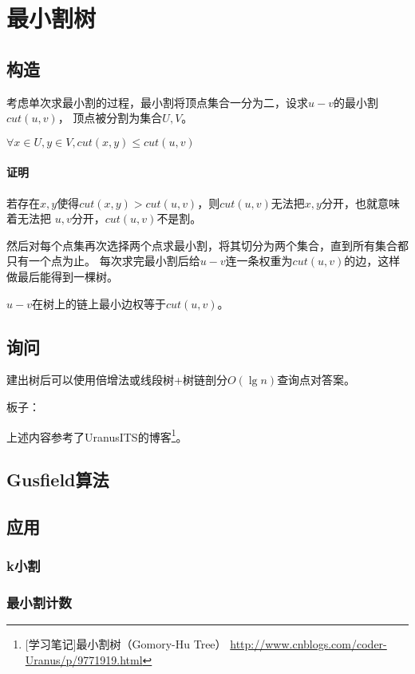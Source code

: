 \section{最小割树}
\subsection{构造}
考虑单次求最小割的过程，最小割将顶点集合一分为二，设求$u-v$的最小割$cut(u,v)$，
顶点被分割为集合$U,V$。
\begin{lemma}
	$\forall x\in U,y\in V,cut(x,y)\leq cut(u,v)$
\end{lemma}
\paragraph{证明}
若存在$x,y$使得$cut(x,y)>cut(u,v)$，则$cut(u,v)$无法把$x,y$分开，也就意味着无法把
$u,v$分开，$cut(u,v)$不是割。

然后对每个点集再次选择两个点求最小割，将其切分为两个集合，直到所有集合都只有一个点为止。
每次求完最小割后给$u-v$连一条权重为$cut(u,v)$的边，这样做最后能得到一棵树。
\begin{theorem}
	$u-v$在树上的链上最小边权等于$cut(u,v)$。
\end{theorem}
\subsection{询问}
建出树后可以使用倍增法或线段树+树链剖分$O(\lg n)$查询点对答案。

板子：

上述内容参考了UranusITS的博客\footnote{
	[学习笔记]最小割树（Gomory-Hu Tree）
	\url{http://www.cnblogs.com/coder-Uranus/p/9771919.html}
}。

\subsection{Gusfield算法}

\subsection{应用}
\subsubsection{k小割}
\subsubsection{最小割计数}
